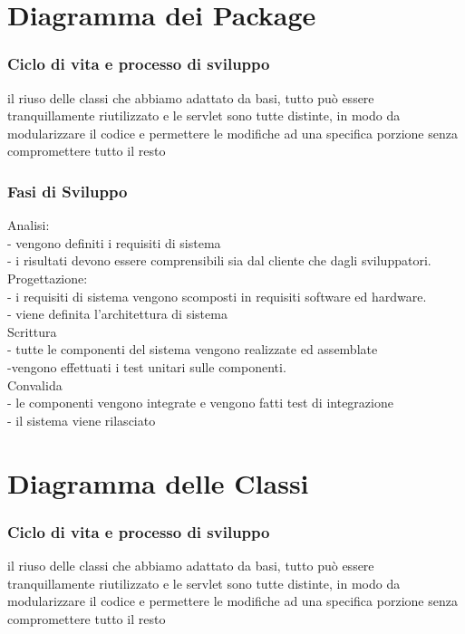 \documentclass[a4paper,12pt]{beamer}
\begin{document}
\pagebreak

\section{Diagramma dei Package}
\begin{frame}
\frametitle{Ciclo di vita e processo di sviluppo}
il riuso delle classi che abbiamo adattato da basi, tutto può essere tranquillamente riutilizzato e le servlet sono tutte distinte, in modo da modularizzare il codice e permettere le modifiche ad una specifica porzione senza compromettere tutto il resto
\end{frame}

\begin{frame}
\frametitle{Fasi di Sviluppo}
Analisi:\\
- vengono definiti i requisiti di sistema\\
- i risultati devono essere comprensibili sia dal cliente che dagli sviluppatori.\\
Progettazione:\\
- i requisiti di sistema vengono scomposti in requisiti software ed hardware.\\
- viene definita l’architettura di sistema\\
Scrittura \\
- tutte le componenti del sistema vengono realizzate ed assemblate  \\
-vengono effettuati i test unitari sulle componenti.\\
Convalida\\
- le componenti vengono integrate e vengono fatti test di integrazione\\
- il sistema viene rilasciato\\
\end{frame}

\pagebreak

\section{Diagramma delle Classi}
\begin{frame}
\frametitle{Ciclo di vita e processo di sviluppo}
il riuso delle classi che abbiamo adattato da basi, tutto può essere tranquillamente riutilizzato e le servlet sono tutte distinte, in modo da modularizzare il codice e permettere le modifiche ad una specifica porzione senza compromettere tutto il resto
\end{frame}
\end{document}
